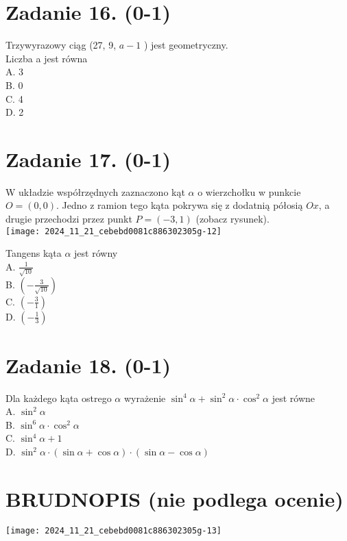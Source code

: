 \documentclass[10pt]{article}
\begin{document}
\section*{Zadanie 16. (0-1)}
Trzywyrazowy ciąg (27, 9, \(a-1\) ) jest geometryczny.\\
Liczba a jest równa\\
A. 3\\
B. 0\\
C. 4\\
D. 2

\section*{Zadanie 17. (0-1)}
W układzie współrzędnych zaznaczono kąt \(\alpha\) o wierzchołku w punkcie \(O=(0,0)\). Jedno z ramion tego kąta pokrywa się z dodatnią półosią \(O x\), a drugie przechodzi przez punkt \(P=(-3,1)\) (zobacz rysunek).\\
\texttt{[image: 2024\_11\_21\_cebebd0081c886302305g-12]}

Tangens kąta \(\alpha\) jest równy\\
A. \(\frac{1}{\sqrt{10}}\)\\
B. \(\left(-\frac{3}{\sqrt{10}}\right)\)\\
C. \(\left(-\frac{3}{1}\right)\)\\
D. \(\left(-\frac{1}{3}\right)\)

\section*{Zadanie 18. (0-1)}
Dla każdego kąta ostrego \(\alpha\) wyrażenie \(\sin ^{4} \alpha+\sin ^{2} \alpha \cdot \cos ^{2} \alpha\) jest równe\\
A. \(\sin ^{2} \alpha\)\\
B. \(\sin ^{6} \alpha \cdot \cos ^{2} \alpha\)\\
C. \(\sin ^{4} \alpha+1\)\\
D. \(\sin ^{2} \alpha \cdot(\sin \alpha+\cos \alpha) \cdot(\sin \alpha-\cos \alpha)\)

\section*{BRUDNOPIS (nie podlega ocenie)}
\begin{center}
\texttt{[image: 2024\_11\_21\_cebebd0081c886302305g-13]}
\end{center}
\end{document}
